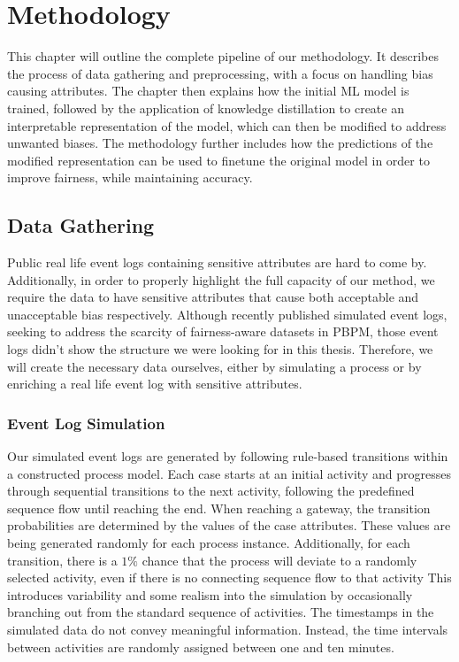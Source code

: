 \chapter{Methodology}
\label{sec:methodology}
This chapter will outline the complete pipeline of our methodology.
It describes the process of data gathering and preprocessing,
with a focus on handling bias causing attributes.
The chapter then explains how the initial ML model is trained,
followed by the application of knowledge distillation to create an interpretable
representation of the model, which can then be modified to address unwanted biases.
The methodology further includes how the predictions of the modified representation
can be used to finetune the original model in order to improve fairness, while maintaining accuracy.

\section{Data Gathering}
Public real life event logs
containing sensitive attributes are hard to come by.
Additionally, in order to properly highlight the full capacity of our method,
we require the data to have sensitive attributes
that cause both acceptable and unacceptable bias respectively.
Although \cite{simulated_logs} recently published simulated event logs,
seeking to address the scarcity of fairness-aware datasets in PBPM,
those event logs didn't show the structure we were looking for in this thesis.
Therefore, we will create the necessary data ourselves,
either by simulating a process or by enriching a real life event log with sensitive attributes.

\subsection{Event Log Simulation}
Our simulated event logs are generated by following rule-based transitions within a constructed process model.
Each case starts at an initial activity and progresses through sequential transitions to the next activity,
following the predefined sequence flow until reaching the end.
When reaching a gateway, the transition probabilities are determined by the values of the case attributes.
These values are being generated randomly for each process instance.
Additionally, for each transition, there is a $1\%$ chance that the process will deviate to a randomly selected activity,
even if there is no connecting sequence flow to that activity
This introduces variability and some realism into the simulation by occasionally branching out from the standard sequence of activities.
The timestamps in the simulated data do not convey meaningful information.
Instead, the time intervals between activities are randomly assigned between one and ten minutes.

